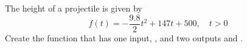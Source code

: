 {The height of a projectile is given by
\[
f(t) = -\frac{9.8}{2} t^2 + 147 t + 500, \quad t>0
\] 
Create the function  that has one input, , and two outputs  and . 
}
{}
